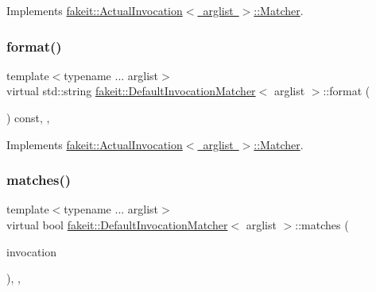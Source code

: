 Implements \mbox{\hyperlink{structfakeit_1_1ActualInvocation_1_1Matcher_ae19e50f7b3a2cd2a9d6670acbaa47c32}{fakeit\+::\+Actual\+Invocation$<$ arglist $>$\+::\+Matcher}}.

\mbox{\label{structfakeit_1_1DefaultInvocationMatcher_a056fc7516e51e5eb15831359cb376fef}} 
\subsubsection{\texorpdfstring{format()}{format()}\hspace{0.1cm}{\footnotesize\ttfamily [9/9]}}
{\footnotesize\ttfamily template$<$typename ... arglist$>$ \\
virtual std\+::string \mbox{\hyperlink{structfakeit_1_1DefaultInvocationMatcher}{fakeit\+::\+Default\+Invocation\+Matcher}}$<$ arglist $>$\+::format (\begin{DoxyParamCaption}{ }\end{DoxyParamCaption}) const\hspace{0.3cm}{\ttfamily [inline]}, {\ttfamily [override]}, {\ttfamily [virtual]}}



Implements \mbox{\hyperlink{structfakeit_1_1ActualInvocation_1_1Matcher_ae19e50f7b3a2cd2a9d6670acbaa47c32}{fakeit\+::\+Actual\+Invocation$<$ arglist $>$\+::\+Matcher}}.

\mbox{\label{structfakeit_1_1DefaultInvocationMatcher_a6eec95726a684a4dc2498b00e68e8166}} 
\subsubsection{\texorpdfstring{matches()}{matches()}\hspace{0.1cm}{\footnotesize\ttfamily [1/9]}}
{\footnotesize\ttfamily template$<$typename ... arglist$>$ \\
virtual bool \mbox{\hyperlink{structfakeit_1_1DefaultInvocationMatcher}{fakeit\+::\+Default\+Invocation\+Matcher}}$<$ arglist $>$\+::matches (\begin{DoxyParamCaption}\item[{\mbox{\hyperlink{structfakeit_1_1ActualInvocation}{Actual\+Invocation}}$<$ arglist... $>$ \&}]{invocation }\end{DoxyParamCaption})\hspace{0.3cm}{\ttfamily [inline]}, {\ttfamily [override]}, {\ttfamily [virtual]}}



